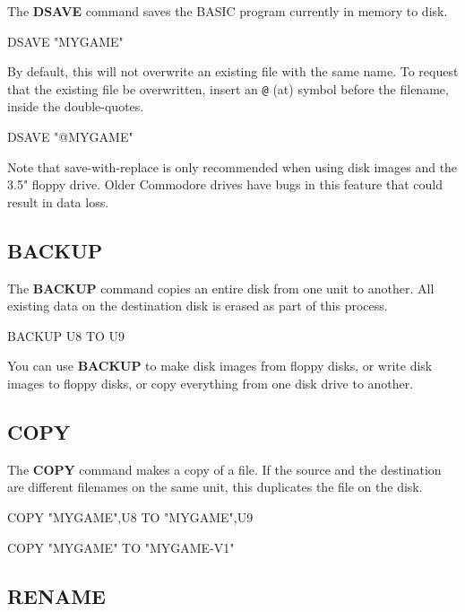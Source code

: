 The {\bf DSAVE} command saves the BASIC program currently in memory to disk.

\begin{screencode}
DSAVE "MYGAME"
\end{screencode}

By default, this will not overwrite an existing file with the same name. To request that the existing file be overwritten, insert an {\tt @} (at) symbol before the filename, inside the double-quotes.

\begin{screencode}
DSAVE "@MYGAME"
\end{screencode}

Note that save-with-replace is only recommended when using disk images and the 3.5" floppy drive. Older Commodore drives have bugs in this feature that could result in data loss.

\subsection{BACKUP}

The {\bf BACKUP} command copies an entire disk from one unit to another. All existing data on the destination disk is erased as part of this process.

\begin{screencode}
BACKUP U8 TO U9
\end{screencode}

You can use {\bf BACKUP} to make disk images from floppy disks, or write disk images to floppy disks, or copy everything from one disk drive to another.

\subsection{COPY}

The {\bf COPY} command makes a copy of a file. If the source and the destination are different filenames on the same unit, this duplicates the file on the disk.

\begin{screencode}
COPY "MYGAME",U8 TO "MYGAME",U9

COPY "MYGAME" TO "MYGAME-V1"
\end{screencode}

\subsection{RENAME}

